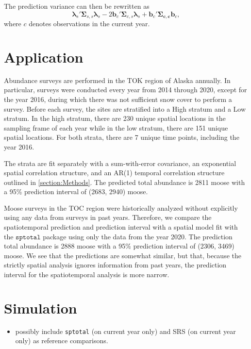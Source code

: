 \documentclass[]{interact}
\theoremstyle{plain}%
\theoremstyle{definition}
\theoremstyle{remark}
\def\tightlist{}
\begin{document}
The prediction variance can then be rewritten as \mbox{}
\begin{equation}
\bm{\lambda}_s'\bm{\Sigma}_{s, s}\bm{\lambda}_s - 2 \mathbf{b}_{c}' \bm{\Sigma}_{c, s} \bm{\lambda}_s + \mathbf{b}_{c}' \bm{\Sigma_{c, c}} \mathbf{b}_{c},
\end{equation} \noindent where \(c\) denotes observations in the current
year.

\section{Application} \label{section:Application}

Abundance surveys are performed in the TOK region of Alaska annually. In
particular, surveys were conducted every year from 2014 through 2020,
except for the year 2016, during which there was not sufficient snow
cover to perform a survey. Before each survey, the sites are stratified
into a High stratum and a Low stratum. In the high stratum, there are
230 unique spatial locations in the sampling frame of each year while in
the low stratum, there are 151 unique spatial locations. For both
strata, there are 7 unique time points, including the year 2016.

The strata are fit separately with a sum-with-error covariance, an
exponential spatial correlation structure, and an AR(1) temporal
correlation structure outlined in \ref{section:Methods}. The predicted
total abundance is 2811 moose with a 95\% prediction interval of (2683,
2940) moose.

Moose surveys in the TOC region were historically analyzed without
explicitly using any data from surveys in past years. Therefore, we
compare the spatiotemporal prediction and prediction interval with a
spatial model fit with the \(\texttt{sptotal}\) package using only the
data from the year 2020. The prediction total abundance is 2888 moose
with a 95\% prediction interval of (2306, 3469) moose. We see that the
predictions are somewhat similar, but that, because the strictly spatial
analysis ignores information from past years, the prediction interval
for the spatiotemporal analysis is more narrow.

\section{Simulation} \label{section:Simulation}

\begin{itemize}
\tightlist
\item
  possibly include \texttt{sptotal} (on current year only) and SRS (on
  current year only) as reference comparisons.
\end{itemize}
\end{document}
